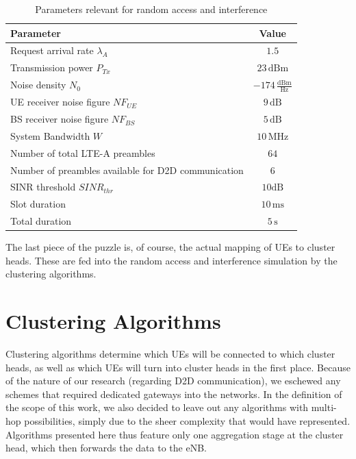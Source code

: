 \begin{table}[H]
\begin{center}
 \begin{tabular}{||p{10cm}|p{2.5cm}||} 
 \hline
 \textbf{Parameter} & \multicolumn{1}{|c||}{\textbf{Value}}\\
 \hline\hline
 Request arrival rate $\lambda_A$ & \multicolumn{1}{|c||}{$1.5$} \\ 
 \hline
 Transmission power $P_{Tx}$& \multicolumn{1}{|c||}{$23\,\text{dBm}$} \\
 \hline
 Noise density $N_0$ & \multicolumn{1}{|c||}{$-174\,\frac{\text{dBm}}{\text{Hz}}$}\\
 \hline
 UE receiver noise figure $NF_{UE}$ & \multicolumn{1}{|c||}{$9\,\text{dB}$}\\
 \hline
 BS receiver noise figure $NF_{BS}$ & \multicolumn{1}{|c||}{$5\,\text{dB}$} \\
 \hline
 System Bandwidth $W$ & \multicolumn{1}{|c||}{$10\,\text{MHz}$} \\
 \hline
 Number of total LTE-A preambles & \multicolumn{1}{|c||}{$64$} \\
 \hline
 Number of preambles available for D2D communication& \multicolumn{1}{|c||}{$6$}\\
 \hline
 SINR threshold $SINR_{thr}$ & \multicolumn{1}{|c||}{$10\text{dB}$}\\
 \hline
 Slot duration & \multicolumn{1}{|c||}{$10\,\text{ms}$}\\
 \hline
 Total duration &\multicolumn{1}{|c||}{$5\,\text{s}$}\\
 \hline
\end{tabular}
\end{center}
\caption{Parameters relevant for random access and interference}
\label{tbl:RA}
\end{table}

The last piece of the puzzle is, of course, the actual mapping of UEs to cluster heads. These are fed into the random access and interference simulation by the clustering algorithms.

\section{Clustering Algorithms}
Clustering algorithms determine which UEs will be connected to which cluster heads, as well as which UEs will turn into cluster heads in the first place. Because of the nature of our research (regarding D2D communication), we eschewed any schemes that required dedicated gateways into the networks. In the definition of the scope of this work, we also decided to leave out any algorithms with multi-hop possibilities, simply due to the sheer complexity that would have represented. Algorithms presented here thus feature only one aggregation stage at the cluster head, which then forwards the data to the eNB.

